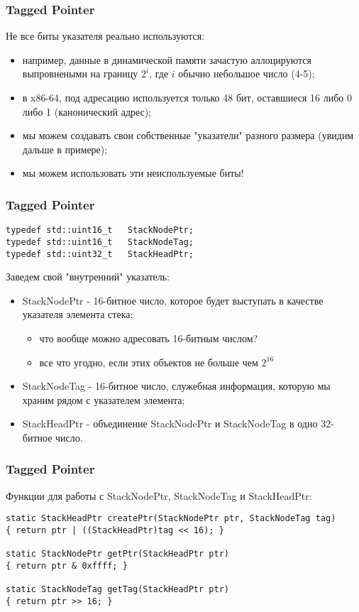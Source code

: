 \begin{frame}
\frametitle{Tagged Pointer}

Не все биты указателя реально используются:
\begin{itemize}
  \item например, данные в динамической памяти зачастую аллоцируются выпровнеными на границу $2^i$, где $i$ обычно небольшое число (4-5);
  \item в x86-64, под адресацию используется только 48 бит, оставшиеся 16 либо 0 либо 1 (канонический адрес);
  \item мы можем создавать свои собственные "указатели" разного размера (увидим дальше в примере);
  \item<2-> мы можем использовать эти неиспользуемые биты!
\end{itemize}
\end{frame}

\begin{frame}[fragile]
\frametitle{Tagged Pointer}

\begin{lstlisting}
typedef std::uint16_t   StackNodePtr;
typedef std::uint16_t   StackNodeTag;
typedef std::uint32_t   StackHeadPtr;
\end{lstlisting}

Заведем свой "внутренний" указатель:
\begin{itemize}
  \item StackNodePtr - 16-битное число, которое будет выступать в качестве указателя элемента стека;
    \begin{itemize}
      \item что вообще можно адресовать 16-битным числом?
      \item<2-> все что угодно, если этих объектов не больше чем $2^{16}$
    \end{itemize}
  \item<3-> StackNodeTag - 16-битное число, служебная информация, которую мы храним рядом с указателем элемента;
  \item<4-> StackHeadPtr - объединение StackNodePtr и StackNodeTag в одно 32-битное число.
\end{itemize}
\end{frame}

\begin{frame}[fragile]
\frametitle{Tagged Pointer}

Функции для работы с StackNodePtr, StackNodeTag и StackHeadPtr:
\begin{lstlisting}
static StackHeadPtr createPtr(StackNodePtr ptr, StackNodeTag tag)
{ return ptr | ((StackHeadPtr)tag << 16); }

static StackNodePtr getPtr(StackHeadPtr ptr)
{ return ptr & 0xffff; }

static StackNodeTag getTag(StackHeadPtr ptr)
{ return ptr >> 16; }
\end{lstlisting}
\end{frame}

